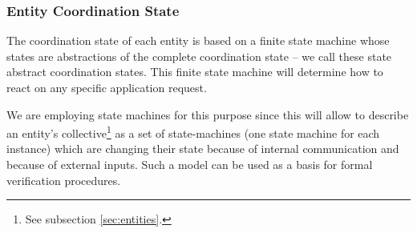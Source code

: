 \documentclass[a4paper, 10pt]{book}
\begin{document}
                                \subsubsection{Entity Coordination State}

                                The coordination state of each entity is based on a finite state
                                machine whose states are abstractions of the complete coordination
                                state -- we call these state abstract coordination states. 
                                This finite state machine will determine how to react on any
                                specific application request.

                                We are employing state machines for this purpose since this will allow
                                to describe an entity's collective\footnote{See subsection
                                \vref{sec:entities}.} as a set of state-machines (one state machine
                                for each instance) which are changing their state because of internal
                                communication and because of external inputs. Such a model can be used
                                as a basis for formal verification procedures.
\end{document}
